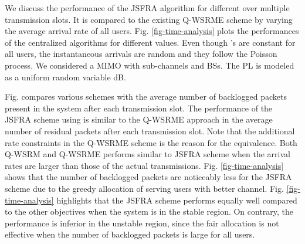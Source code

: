 
We discuss the performance of the \ac{JSFRA} algorithm for different  over multiple transmission slots. It is compared to the existing \ac{Q-WSRME} scheme by varying the average arrival rate  of all users. Fig. \ref{fig-time-analysis} plots the performances of the centralized algorithms for different  values. Even though 's are constant for all users, the instantaneous arrivals are random and they follow the Poisson process. We considered a  \ac{MIMO} with  sub-channels and  \acp{BS}. The \ac{PL} is modeled as a uniform random variable \me{[0,-3]} dB.

Fig.  compares various schemes with the average number of backlogged packets present in the system after each transmission slot. The performance of the \ac{JSFRA} scheme using  is similar to the \ac{Q-WSRME} approach in the average number of residual packets after each transmission slot. Note that the additional rate constraints in the \ac{Q-WSRME} scheme is the reason for the equivalence. Both \ac{Q-WSRM} and \ac{Q-WSRME} performs similar to  \ac{JSFRA} scheme when the arrival rates are larger than those of the actual transmissions. Fig. \ref{fig-time-analysis} shows that the number of backlogged packets are noticeably less for the  \ac{JSFRA} scheme due to the greedy allocation of serving users with better channel. Fig. \ref{fig-time-analysis} highlights that the \me{\ell_{\infty}} \ac{JSFRA} scheme performs equally well compared to the other objectives when the system is in the stable region. On contrary, the performance is inferior in the unstable region, since the fair allocation is not effective when the number of backlogged packets is large for all users.
